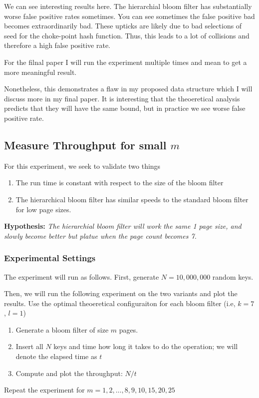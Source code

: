 \documentclass[a4paper]{article}
\theoremstyle{plain}
\theoremstyle{definition}
\begin{document}
	We can see interesting results here. 
	The hierarchial bloom filter has substantially worse false positive rates sometimes. 
	You can see sometimes the false positive bad becomes extraordinarily bad. 
	These upticks are likely due to bad selections of seed for the choke-point hash function. Thus, this leads to a lot of collisions and therefore a high false positive rate.

	For the filnal paper I will run the experiment multiple times and mean to get a more meaningful result.

	Nonetheless, this demonstrates a flaw in my proposed data structure which I will discuss more in my final paper.
	It is interesting that the theoeretical analysis predicts that they will have the same bound, but in practice we see worse false positive rate.
	\subsection{Measure Throughput for small $m$}
	
	For this experiment, we seek to validate two things 
	\begin{enumerate}
		\item The run time is constant with respect to the size of the bloom filter
		\item The hierarchical bloom filter has similar speeds to the standard bloom filter for low page sizes.
	\end{enumerate}

	\textbf{Hypothesis:} \textit{The hierarchial bloom filter will work the same 1 page size, and slowly become better but platue when the page count becomes 7.}
	\subsubsection{Experimental Settings}
	The experiment will run as follows.
	First, generate $N=10,000,000$ random keys. 

	Then, we will run the following experiment on the two variants and plot the results.
	Use the optimal theoeretical configuraiton for each bloom filter (i.e, $k=7$, $l=1$)
 	\begin{enumerate}
		\item Generate a bloom filter of size $m$ pages.
		\item Insert all $N$ keys and time how long it takes to do the operation; we will denote the elapsed time as $t$
		\item Compute and plot the throughput: $N/t$
	\end{enumerate}
	Repeat the experiment for $m = 1,2,\ldots,8,9,10,15,20,25$
\end{document}
